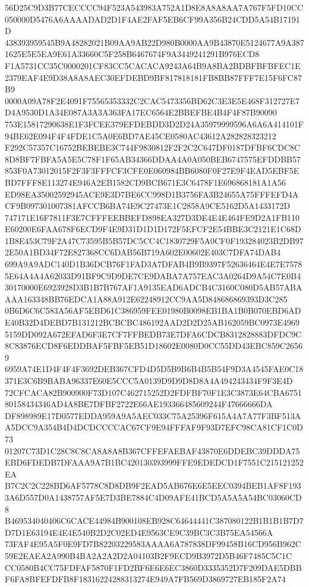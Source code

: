\documentclass[UTF8,fontset=fandol,zihao=-4,a4paper]{ctexart}
\begin{document}
{{56D25C9D3B77CECCCC94F523A543983A752A1D8E8A8A8AA7A767F5FD10CC050000D5476A6AAAADAD2D1F4AE2FAF5EB6CF99A356B24CDD5A54B17191D
438393959545B9A48282021B09AA9AB22D980B0000AA9B43870E5124677A9A3871625E5E5EA9E61A33660C5F258B6467674F9A3449241291B976ECD8
F1A5731CC35C0000201CF83CC5CACACA9243A64B9A8BA2BDBFBFBFEC1E2379EAF4E9D38A8A8AEC30EFDEBD9BF817818181FB8BB87FFF7E15F6FC87B9
0000A09A78F2E4091F75565353332C2CAC5473356BD62C3E3E5E468F312727E7D4A9530D1A34E087A3A3A363FA17EC6564E2BBEFBE4B4F4F87B90090
753E15817290638E1F3FCEE379EFDEBDD3D2D24A35979999596A6A6A414101F94BE62E094F4F4FDE1C5A0E6BD7AE45CE0580AC43612A282828323212
F292C57357C16752BEBEBE3C744F9830812F2F2C2C647DF0187DFBF6CDC8C8D8BF7FBFA5A5E5C78F1F65AB34366DDAA4A0A050BEB6747575EFDDBB57
853F0A73012015F2F3F3FFFCF3CFE0E060984BB6080F0F27E9F4EAD5EBF5EBD7FFF8E113274E946A2EB1582CD9BCB671E3C6478F1E696868181A1A56
ED98EA35002592945ACE9E3D7BE6CC998D1B3756FA3B24655A75FFFEFD4ACF9B097301007381AFCCB6BA74E9C27473E1C2858A9CE5162D5A1433172D
747171E16F7811F3E7CFFFEEBBEFD898EA327D3DE4E4E464FE9D2A1FB110E60200E6FAA678F6ECD9F4E9D31D1D1D172F5EFCF2E54BBE3C2121E1C68D
1B8E453C79F2A47C73595B5B57DC5CC4C1830729F5A0CF0F193284023B2DB972E50A1BD34F72E827368CC6DAB56B719A602E00602E403C7DFA74DAB4
699A9A9ADC140D1B36DCB76F1FAD3A7DFAB4B9B9397F52636464E4E7E75785E64A4A4A62033D91BF9C9D9DE7CE9DABA7A757EAC3A0264D9A54C7E0B4
30170000E6923928D3B1B7B767AF1A9135EAD6ADCB4C3160C080D5AB57ABAAAA163348BB76EDCA1A88A912E62248912CC9AA5D848686869393D3C285
0B6D6C6C583A56AF5EBD61C386959FEE01980B0098EB1BA1B0B070EBD6ADE40B32D4DEBD7B131212BCBCBC486192AAD2D2D25AB162059BC0973E4969
5159DD092A672EFAD6F3E7CF7FFBEDB73E7DFA6CDCB8312828883DFDC9C8C83876ECD8F6EDDBAF5FBF5EB51D18602E0080D0CC55DD43EBC859C26569
6959A74E1D4F4F4F3692DEB367CFD4D5D5B9B6B4B5B54F9D3A4545FAE0C18371E3C6B9BABA96337E60E5CCC5A0139D9D9D8D8A4A494243434F9F3E4D
72CFCACA82B900900F73D107C462715252D2FDFBF70F1E3C3873E64CBA675180158434346AD4A8BE7DFBF2722E66AE193366485609244F47666666DA
DF898989E17D0577EDDA959A9A5AEC033C75A25396F615A4A7A77F3BF513AA5DCC9A354B4D4DCDCCCCAC67CF9E94FFFAF9F93D7EFC98CA81CF1C0D73
01207C73D1C28C8C8CA8A8A8B367CFFEFAEBAF43870E6DDEBC39DDDA75EBD6FDEDB7DFAAA9A7B1BC420130393999FFE9EDEDCD1F7551C215121252EA
B7C2C2C228BD6AF5778C8D8DB9F2EAD5AB676E6E5EEC0394BEB1AF8F1933A6D557D0A1438757AF5E7D3BE7884C4D09AFE41BCD5A5A5A54BC03060CD8
B469534040406C6CACE44984B900108EB928C64644441C387080122B1B1B1B7D7D7D1E63194E4E4E540B2D2C02ED4E9563CE9C39BC3C3B75EA54566A
73FAF4E95A5F0E9FD7B82203229583AAAA6A787838DF99458B16CD956B962C59E2EAEA2A990B4BA2A2A2D2A04103B2F9ECD9B3972D5B46F7485C5C1C
CC0580B4CC75FDFAF5870F1FD2BF6E6E6EC3860D3335352D7F209DAE5DBBF6FA8BFEFDFB8F18316224288313274E949A7FB569D3869727EB185F2A74
}}
\end{document}
